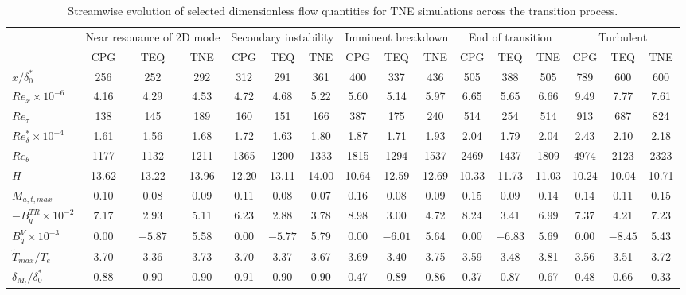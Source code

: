 \newpage
\begin{table}
\centering
\caption{Streamwise evolution of selected dimensionless flow quantities for TNE simulations across the transition process.}
\begin{tabular}{lccc ccc ccc ccc ccc}
\toprule
 & \multicolumn{3}{c}{Near resonance of 2D mode} 
 & \multicolumn{3}{c}{Secondary instability} 
 & \multicolumn{3}{c}{Imminent breakdown} 
 & \multicolumn{3}{c}{End of transition} 
 & \multicolumn{3}{c}{Turbulent} \\
\cmidrule(lr){2-4} \cmidrule(lr){5-7} \cmidrule(lr){8-10} \cmidrule(lr){11-13} \cmidrule(lr){14-16}
 & CPG & TEQ & TNE & CPG & TEQ & TNE & CPG & TEQ & TNE & CPG & TEQ & TNE & CPG & TEQ & TNE \\
\midrule
$x/\delta^*_0$ & 256 & 252 & 292 & 312 & 291 & 361 & 400 & 337 & 436 & 505 & 388 & 505 & 789 & 600 & 600 \\
$Re_x \times 10^{-6}$ & 4.16 & 4.29 & 4.53 & 4.72 & 4.68 & 5.22 & 5.60 & 5.14 & 5.97 & 6.65 & 5.65 & 6.66 & 9.49 & 7.77 & 7.61 \\
$Re_\tau$ & 138 & 145 & 189 & 160 & 151 & 166 & 387 & 175 & 240 & 514 & 254 & 514 & 913 & 687 & 824 \\
$Re^*_\delta \times 10^{-4}$ & 1.61 & 1.56 & 1.68 & 1.72 & 1.63 & 1.80 & 1.87 & 1.71 & 1.93 & 2.04 & 1.79 & 2.04 & 2.43 & 2.10 & 2.18 \\
$Re_\theta$ & 1177 & 1132 & 1211 & 1365 & 1200 & 1333 & 1815 & 1294 & 1537 & 2469 & 1437 & 1809 & 4974 & 2123 & 2323 \\
$H$ & 13.62 & 13.22 & 13.96 & 12.20 & 13.11 & 14.00 & 10.64 & 12.59 & 12.69 & 10.33 & 11.73 & 11.03 & 10.24 & 10.04 & 10.71 \\
$M_{a,t,max}$ & 0.10 & 0.08 & 0.09 & 0.11 & 0.08 & 0.07 & 0.16 & 0.08 & 0.09 & 0.15 & 0.09 & 0.14 & 0.14 & 0.11 & 0.15 \\
$-B_q^{TR} \times 10^{-2}$ & 7.17 & 2.93 & 5.11 & 6.23 & 2.88 & 3.78 & 8.98 & 3.00 & 4.72 & 8.24 & 3.41 & 6.99 & 7.37 & 4.21 & 7.23 \\
$B_q^{V} \times 10^{-3}$ & 0.00 & $-5.87$ & 5.58 & 0.00 & $-5.77$ & 5.79 & 0.00 & $-6.01$ & 5.64 & 0.00 & $-6.83$ & 5.69 & 0.00 & $-8.45$ & 5.43 \\
$\tilde{T}_{max}/T_e$ & 3.70 & 3.36 & 3.73 & 3.70 & 3.37 & 3.67 & 3.69 & 3.40 & 3.75 & 3.59 & 3.48 & 3.81 & 3.56 & 3.51 & 3.72 \\
$\delta_{M_t}/\delta^{*}_{0}$ & 0.88 & 0.90 & 0.90 & 0.91 & 0.90 & 0.90 & 0.47 & 0.89 & 0.86 & 0.37 & 0.87 & 0.67 & 0.48 & 0.66 & 0.33 \\

\end{tabular}
\end{table}
